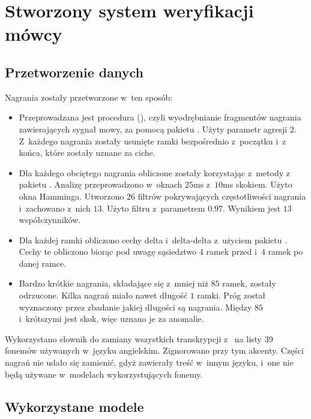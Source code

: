 \chapter{Stworzony system weryfikacji mówcy}\label{chap:badania}

\section{Przetworzenie danych}
\label{sec:data_wrangling}

Nagrania  zostały przetworzone w~ten sposób:

\begin{itemize}
    \item Przeprowadzana jest procedura  (), czyli wyodrębnianie
        fragmentów nagrania zawierających sygnał mowy, za pomocą pakietu . Użyty parametr
        agresji $2$. Z~każdego nagrania zostały usunięte ramki bezpośrednio z~początku i~z końca, które zostały
        uznane za ciche.
    \item Dla każdego obciętego nagrania obliczone zostały  korzystając z~metody z
        pakietu . Analizę przeprowadzono w~oknach $25$ms z~$10$ms skokiem.
        Użyto okna Hamminga. Utworzono $26$ filtrów pokrywających częstotliwości nagrania i~zachowano z~nich
        $13$. Użyto filtru  z~parametrem $0.97$. Wynikiem jest $13$ współczynników.
    \item Dla każdej ramki obliczono cechy delta i~delta-delta z~użyciem pakietu .
        Cechy te obliczono biorąc pod uwagę sąsiedztwo $4$ ramek przed i~$4$ ramek po danej ramce.
    \item Bardzo krótkie nagrania, składające się z~mniej niż $85$ ramek, zostały odrzucone. Kilka nagrań miało
        nawet długość $1$ ramki. Próg został wyznaczony przez zbadanie jakiej długości są nagrania. Między $85$
        i~krótszymi jest skok, więc uznano je za anomalie.
\end{itemize}

Wykorzystano słownik  do zamiany wszystkich transkrypcji z~ na listy 39 fonemów
używanych w~języku angielskim. Zignorowano przy tym akcenty. Części nagrań nie udało się zamienić, gdyż
zawierały treść w~innym języku, i~one nie będą używane w~modelach wykorzystujących fonemy.

\section{Wykorzystane modele}
\label{sec:data_models}

